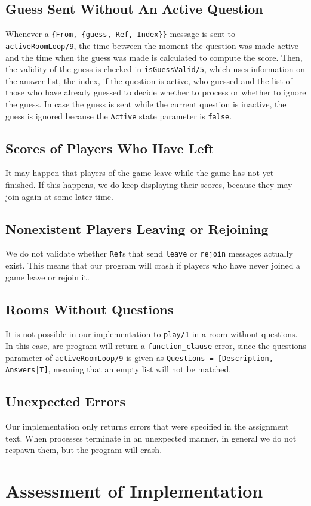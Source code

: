 \documentclass{article}
\begin{document}
\subsection{Guess Sent Without An Active Question}
Whenever a \texttt{\{From, \{guess, Ref, Index\}\}} message is sent to \texttt{activeRoomLoop/9}, the time between the moment the question was made active and the time when the guess was made is calculated to compute the score. Then, the validity of the guess is checked in \texttt{isGuessValid/5}, which uses information on the answer list, the index, if the question is active, who guessed and the list of those who have already guessed to decide whether to process or whether to ignore the guess. In case the guess is sent while the current question is inactive, the guess is ignored because the \texttt{Active} state parameter is \texttt{false}.

\subsection{Scores of Players Who Have Left}
It may happen that players of the game leave while the game has not yet finished. If this happens, we do keep displaying their scores, because they may join again at some later time.

\subsection{Nonexistent Players Leaving or Rejoining}
We do not validate whether \texttt{Ref}s that send \texttt{leave} or \texttt{rejoin} messages actually exist. This means that our program will crash if players who have never joined a game leave or rejoin it.

\subsection{Rooms Without Questions}
It is not possible in our implementation to \texttt{play/1} in a room without questions. In this case, are program will return a  \texttt{function\_clause} error, since the questions parameter of \texttt{activeRoomLoop/9} is given as \texttt{Questions = [{Description, Answers}|T]}, meaning that an empty list will not be matched.

\subsection{Unexpected Errors}
Our implementation only returns errors that were specified in the assignment text. When processes terminate in an unexpected manner, in general we do not respawn them, but the program will crash.

\section{Assessment of Implementation}
\end{document}
